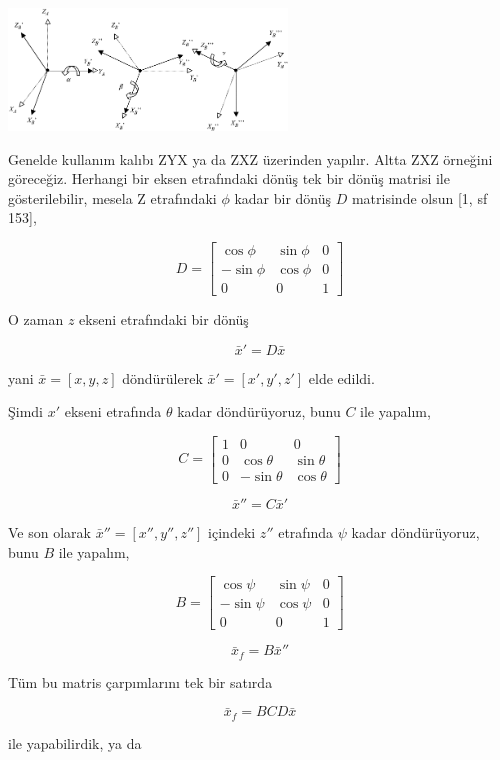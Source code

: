 \documentclass[12pt,fleqn]{article}\usepackage{../../common}
\begin{document}
\includegraphics[width=20em]{phy_072_rot_06.png}

Genelde kullanım kalıbı ZYX ya da ZXZ üzerinden yapılır. Altta ZXZ örneğini
göreceğiz. Herhangi bir eksen etrafındaki dönüş tek bir dönüş matrisi ile
gösterilebilir, mesela Z etrafındaki $\phi$ kadar bir dönüş $D$ matrisinde olsun
[1, sf 153],

$$
D = \left[\begin{array}{rrr}
\cos \phi & \sin\phi & 0 \\
-\sin \phi & \cos\phi & 0 \\
0 & 0 & 1
\end{array}\right]
$$

O zaman $z$ ekseni etrafındaki bir dönüş

$$
\bar{x}' = D \bar{x}
$$

yani $\bar{x} = [x, y, z]$ döndürülerek $\bar{x}' = [x', y', z']$ elde edildi.

Şimdi $x'$ ekseni etrafında $\theta$ kadar döndürüyoruz, bunu $C$ ile yapalım,

$$
C = \left[\begin{array}{rrr}
1 & 0 & 0 \\
0 & \cos\theta & \sin\theta \\
0 & -\sin\theta & \cos\theta
\end{array}\right]
$$

$$
\bar{x}'' = C \bar{x}'
$$

Ve son olarak $\bar{x}'' = [x'',y'',z'']$ içindeki $z''$ etrafında $\psi$ kadar
döndürüyoruz, bunu $B$ ile yapalım,

$$
B = \left[\begin{array}{rrr}
\cos \psi & \sin\psi & 0 \\
-\sin \psi & \cos\psi & 0 \\
0 & 0 & 1
\end{array}\right]
$$

$$
\bar{x}_f = B \bar{x}''
$$

Tüm bu matris çarpımlarını tek bir satırda

$$
\bar{x}_f =  B C D \bar{x}
$$

ile yapabilirdik, ya da
\end{document}
